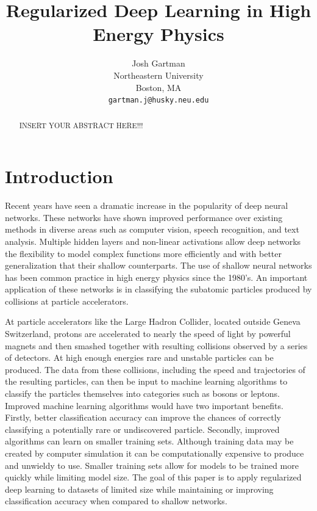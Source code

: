 \documentclass[12pt,letterpaper]{article}
\begin{document}
\title{Regularized Deep Learning in High Energy Physics}

\author{Josh Gartman\\
Northeastern University\\
Boston, MA\\
{\tt\small gartman.j@husky.neu.edu}
}

\maketitle

\begin{abstract}
  INSERT YOUR ABSTRACT HERE!!!
\end{abstract}

\section{Introduction}
Recent years have seen a dramatic increase in the popularity of deep neural networks.  These networks have shown improved performance over existing methods in diverse areas such as computer vision, speech recognition, and text analysis.  Multiple hidden layers and non-linear activations allow deep networks the flexibility to model complex functions more efficiently and with better generalization that their shallow counterparts.  The use of shallow neural networks has been common practice in high energy physics since the 1980's.  An important application of these networks is in classifying the subatomic particles produced by collisions at particle accelerators.

At particle accelerators like the Large Hadron Collider, located outside Geneva Switzerland, protons are accelerated to nearly the speed of light by powerful magnets and then smashed together with resulting collisions observed by a series of detectors.  At high enough energies rare and unstable particles can be produced.  The data from these collisions, including the speed and trajectories of the resulting particles, can then be input to machine learning algorithms to classify the particles themselves into categories such as bosons or leptons.  Improved machine learning algorithms would have two important benefits.  Firstly, better classification accuracy can improve the chances of correctly classifying a potentially rare or undiscovered particle.  Secondly, improved algorithms can learn on smaller training sets.  Although training data may be created by computer simulation it can be computationally expensive to produce and unwieldy to use.  Smaller training sets allow for models to be trained more quickly while limiting model size.  The goal of this paper is to apply regularized deep learning to datasets of limited size while maintaining or improving classification accuracy when compared to shallow networks.
\end{document}
